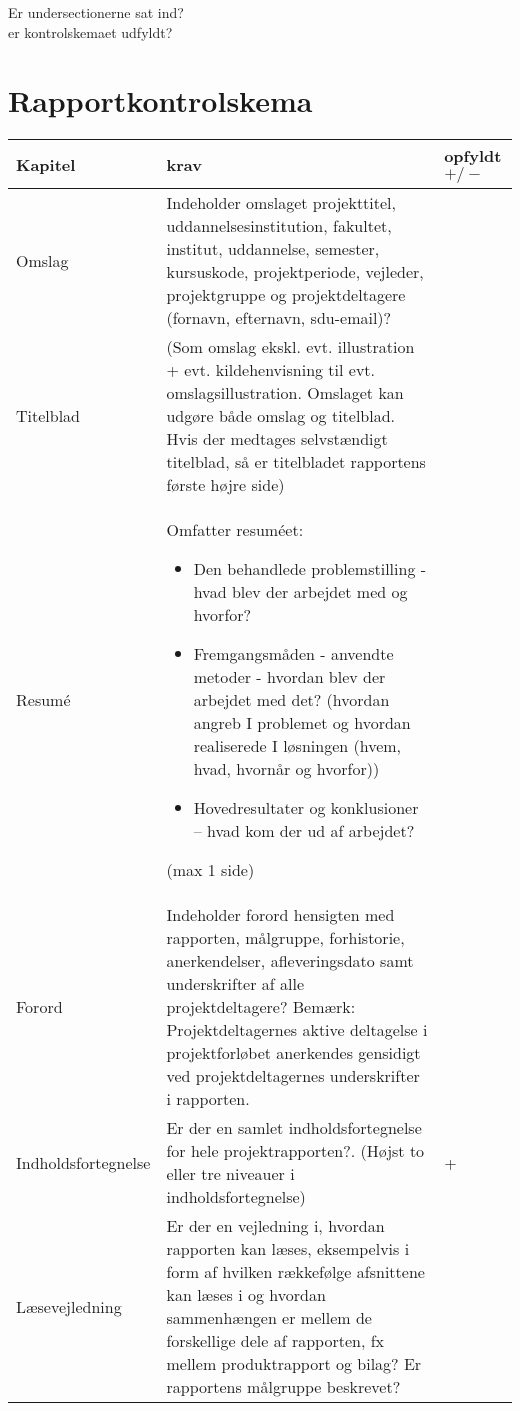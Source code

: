Er undersectionerne sat ind?\\
er kontrolskemaet udfyldt?


%

\section{Rapportkontrolskema}

\begin{center}
\begin{longtable}{| m{3.5cm} | m{10cm} | m{2.5cm} |}

\hline
Kapitel & krav & opfyldt $+/-$ \\ \hline
Omslag & Indeholder omslaget projekttitel, uddannelsesinstitution, fakultet, institut, uddannelse, semester, kursuskode, projektperiode, vejleder, projektgruppe og projektdeltagere (fornavn, efternavn, sdu-email)? & \\
\hline
Titelblad & (Som omslag ekskl. evt. illustration + evt. kildehenvisning til evt. omslagsillustration. Omslaget kan udgøre både omslag og titelblad. Hvis der medtages selvstændigt titelblad, så er titelbladet rapportens første højre side) & \\
\hline
Resumé & 
Omfatter resuméet:
\begin{itemize}
\item Den behandlede problemstilling - hvad blev der arbejdet med og hvorfor?
\item Fremgangsmåden - anvendte metoder - hvordan blev der arbejdet med det? 
(hvordan angreb I problemet og hvordan realiserede I løsningen (hvem, hvad, hvornår og hvorfor))
\item Hovedresultater og konklusioner  – hvad kom der ud af arbejdet?
\end{itemize}
(max  1 side)& \\
\hline
Forord & Indeholder forord hensigten med rapporten, målgruppe, forhistorie, anerkendelser, afleveringsdato samt underskrifter af alle projektdeltagere? \newline
Bemærk: Projektdeltagernes aktive deltagelse i projektforløbet anerkendes gensidigt ved projektdeltagernes underskrifter i rapporten. & \\
\hline
Indholdsfortegnelse & Er der en samlet indholdsfortegnelse for hele projektrapporten?. (Højst to eller tre niveauer i indholdsfortegnelse) & + \\
\hline
Læsevejledning & Er der en vejledning i, hvordan rapporten kan læses, eksempelvis i form af hvilken rækkefølge afsnittene kan læses i og hvordan sammenhængen er mellem de forskellige dele af rapporten, fx mellem produktrapport og bilag? \newline Er rapportens målgruppe beskrevet? & \\

\end{longtable}
\end{center}
